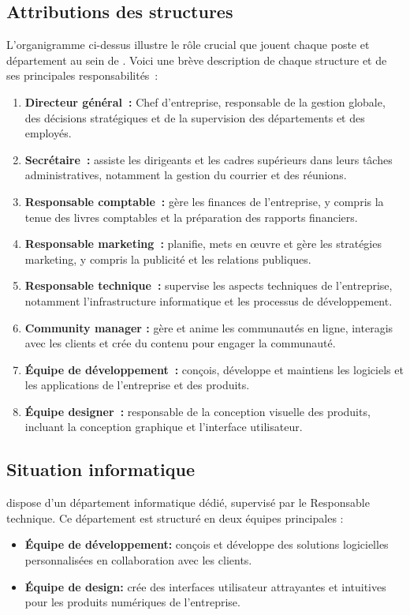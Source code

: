 \subsection{Attributions des structures}
L’organigramme ci-dessus illustre le rôle crucial que jouent chaque poste et
département au sein de \firm. Voici une brève description de chaque
structure et de ses principales responsabilités :
\begin{enumerate}
  \item \textbf{Directeur général :} Chef d’entreprise, responsable de la gestion globale,
    des décisions stratégiques et de la supervision des départements et des employés.

  \item \textbf{Secrétaire :} assiste les dirigeants et les cadres supérieurs dans leurs
    tâches administratives, notamment la gestion du courrier et des réunions.

  \item \textbf{Responsable comptable :} gère les finances de l’entreprise, y compris la
    tenue des livres comptables et la préparation des rapports financiers.

  \item \textbf{Responsable marketing :} planifie, mets en œuvre et gère les stratégies
    marketing, y compris la publicité et les relations publiques.

  \item \textbf{Responsable technique :} supervise les aspects techniques de l’entreprise,
    notamment l’infrastructure informatique et les processus de développement.

  \item \textbf{Community manager :} gère et anime les communautés en ligne, interagis
    avec les clients et crée du contenu pour engager la communauté.

  \item \textbf{Équipe de développement :} conçois, développe et maintiens les logiciels
    et les applications de l’entreprise et des produits.

  \item \textbf{Équipe designer :} responsable de la conception visuelle des produits,
    incluant la conception graphique et l’interface utilisateur.

\end{enumerate}

\subsection{Situation informatique}
\firm dispose d’un département informatique dédié, supervisé par le Responsable
technique. Ce département est structuré en deux équipes principales :
\begin{itemize}

  \item \textbf{Équipe de développement:} conçois et développe des solutions logicielles
    personnalisées en collaboration avec les clients.
  \item \textbf{Équipe de design:} crée des interfaces utilisateur attrayantes et intuitives
    pour les produits numériques de l’entreprise.
\end{itemize}

